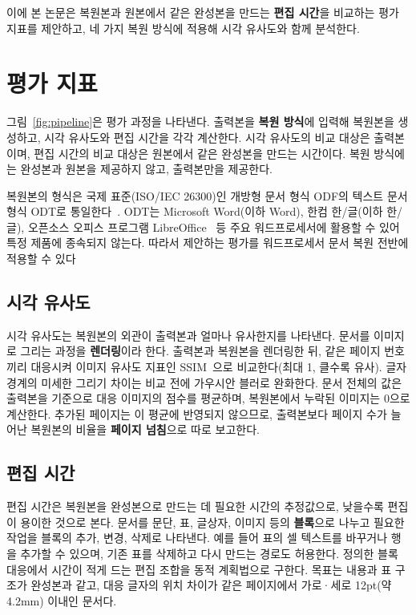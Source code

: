 \documentclass{kcc}
\begin{document}
이에 본 논문은 복원본과 원본에서 같은 완성본을 만드는 \textbf{편집 시간}을 비교하는 평가 지표를 제안하고, 네 가지 복원 방식에 적용해 시각 유사도와 함께 분석한다.

\section{평가 지표}

그림~\ref{fig:pipeline}은 평가 과정을 나타낸다.
출력본을 \textbf{복원 방식}에 입력해 복원본을 생성하고, 시각 유사도와 편집 시간을 각각 계산한다.
시각 유사도의 비교 대상은 출력본이며, 편집 시간의 비교 대상은 원본에서 같은 완성본을 만드는 시간이다.
복원 방식에는 완성본과 원본을 제공하지 않고, 출력본만을 제공한다.

복원본의 형식은 국제 표준(ISO/IEC 26300)인 개방형 문서 형식 ODF의 텍스트 문서 형식 ODT로 통일한다~\cite{iso26300}.
ODT는 Microsoft Word(이하 Word), 한컴 한/글(이하 한/글), 오픈소스 오피스 프로그램 LibreOffice~\cite{libreoffice} 등 주요 워드프로세서에 활용할 수 있어 특정 제품에 종속되지 않는다. 따라서 제안하는 평가를 워드프로세서 문서 복원 전반에 적용할 수 있다



\subsection{시각 유사도}

시각 유사도는 복원본의 외관이 출력본과 얼마나 유사한지를 나타낸다.
문서를 이미지로 그리는 과정을 \textbf{렌더링}이라 한다.
출력본과 복원본을 렌더링한 뒤, 같은 페이지 번호끼리 대응시켜 이미지 유사도 지표인 SSIM~\cite{wang2004ssim}으로 비교한다(최대 1, 클수록 유사).
글자 경계의 미세한 그리기 차이는 비교 전에 가우시안 블러로 완화한다.
문서 전체의 값은 출력본을 기준으로 대응 이미지의 점수를 평균하며, 복원본에서 누락된 이미지는 0으로 계산한다.
추가된 페이지는 이 평균에 반영되지 않으므로, 출력본보다 페이지 수가 늘어난 복원본의 비율을 \textbf{페이지 넘침}으로 따로 보고한다.

\subsection{편집 시간}

편집 시간은 복원본을 완성본으로 만드는 데 필요한 시간의 추정값으로, 낮을수록 편집이 용이한 것으로 본다.
문서를 문단, 표, 글상자, 이미지 등의 \textbf{블록}으로 나누고 필요한 작업을 블록의 추가, 변경, 삭제로 나타낸다.
예를 들어 표의 셀 텍스트를 바꾸거나 행을 추가할 수 있으며, 기존 표를 삭제하고 다시 만드는 경로도 허용한다.
정의한 블록 대응에서 시간이 적게 드는 편집 조합을 동적 계획법으로 구한다.
목표는 내용과 표 구조가 완성본과 같고, 대응 글자의 위치 차이가 같은 페이지에서 가로·세로 12pt(약 4.2mm) 이내인 문서다.
\end{document}
